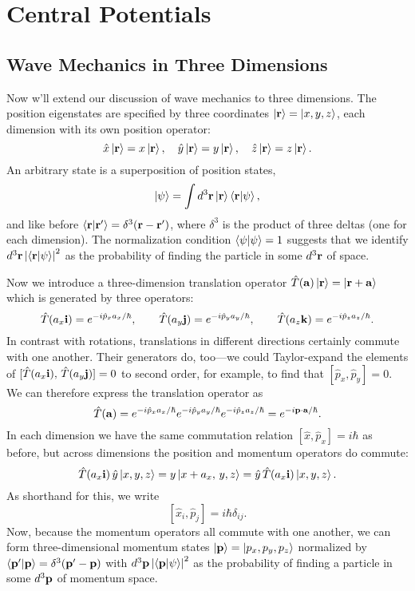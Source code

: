 \documentclass[../p116main.tex]{subfiles}
\begin{document}
\chapter{Central Potentials}
\section{Wave Mechanics in Three Dimensions}
Now w'll extend our discussion of wave mechanics to three dimensions.
The position eigenstates are specified by three coordinates $\left| \mathbf{r} \right> = \left| x,y,z \right>$, each dimension with its own position operator:
\[ \hat x \left| \mathbf{r} \right> = x \left| \mathbf{r} \right>, \quad \hat y \left| \mathbf{r} \right> = y \left| \mathbf{r} \right>, \quad \hat z \left| \mathbf{r} \right> = z \left| \mathbf{r} \right>. \]
An arbitrary state is a superposition of position states,
\[ \left| \psi \right> = \int d^3 \mathbf{r} \left| \mathbf{r} \right> \left< \mathbf{r} \middle| \psi \right>, \]
and like before $\left< \mathbf{r} \middle| \mathbf{r}' \right> = \delta^3(\mathbf{r} - \mathbf{r}')$, where $\delta^3$ is the product of three deltas (one for each dimension).
The normalization condition $\left< \psi \middle| \psi \right> = 1$ suggests that we identify $d^3 \mathbf{r} \left| \left< \mathbf{r} \middle| \psi \right> \right|^2$ as the probability of finding the particle in some $d^3 \mathbf{r}$ of space.

Now we introduce a three-dimension translation operator $\hat T(\mathbf{a}) \left| \mathbf{r} \right> = \left| \mathbf{r} + \mathbf{a} \right>$ which is generated by three operators:
\[ \hat T(a_x \mathbf{i}) = e^{-i \hat p_x a_x / \hbar}, \qquad \hat T(a_y \mathbf{j}) = e^{-i \hat p_y a_y / \hbar}, \qquad \hat T(a_z \mathbf{k}) = e^{-i \hat p_z a_z / \hbar}. \]
In contrast with rotations, translations in different directions certainly commute with one another.
Their generators do, too---we could Taylor-expand the elements of $[\hat T(a_x \mathbf{i}), \,\hat T(a_y \mathbf{j})] = 0$ to second order, for example, to find that $[\hat p_x, \hat p_y] = 0$.
We can therefore express the translation operator as
\[ \hat T(\mathbf{a}) = e^{-i \hat p_x a_x / \hbar} e^{-i \hat p_y a_y / \hbar} e^{-i \hat p_z a_z / \hbar} = e^{-i \mathbf{p} \cdot \mathbf{a} / \hbar}. \]
In each dimension we have the same commutation relation $[\hat x, \hat p_x] = i\hbar$ as before, but across dimensions the position and momentum operators do commute:
\[ \hat T(a_x \mathbf{i}) \, \hat y \left| x,y,z \right> = y \left| x + a_x, \, y, z \right> = \hat y \, \hat T(a_x \mathbf{i}) \left| x,y,z \right>. \]
As shorthand for this, we write
\[ [\hat x_i, \hat p_j] = i \hbar \delta_{ij}. \]
Now, because the momentum operators all commute with one another, we can form three-dimensional momentum states $\left| \mathbf{p} \right> = \left| p_x, p_y, p_z \right>$ normalized by $\left< \mathbf{p}' \middle| \mathbf{p} \right> = \delta^3(\mathbf{p}' - \mathbf{p})$ with $d^3 \mathbf{p} \left| \left< \mathbf{p} \middle| \psi \right> \right|^2$ as the probability of finding a particle in some $d^3 \mathbf{p}$ of momentum space.
\end{document}
